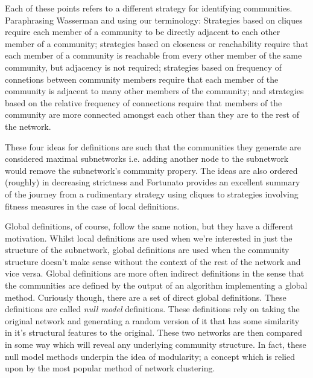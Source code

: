 Each of these points refers to a different strategy for identifying communities. Paraphrasing Wasserman and using our terminology: Strategies based on cliques require each member of a community to be directly adjacent to each other member of a community; strategies based on closeness or reachability require that each member of a community is reachable from every other member of the same community, but adjacency is not required; strategies based on frequency of connetions between community members require that each member of the community is adjacent to many other members of the community; and strategies based on the relative frequency of connections require that members of the community are more connected amongst each other than they are to the rest of the network.

These four ideas for definitions are such that the communities they generate are considered maximal subnetworks i.e. adding another node to the subnetwork would remove the subnetwork's community propery. The ideas are also ordered (roughly) in decreasing strictness and Fortunato provides an excellent summary of the journey from a rudimentary strategy using cliques to strategies involving fitness measures in the case of local definitions.\cite[88-90]{fortunato}

Global definitions, of course, follow the same notion, but they have a different motivation. Whilst local definitions are used when we're interested in just the structure of the subnetwork, global definitions are used when the community structure doesn't make sense without the context of the rest of the network and vice versa. Global definitions are more often indirect definitions in the sense that the communities are defined by the output of an algorithm implementing a global method. Curiously though, there are a set of direct global definitions. These definitions are called \emph{null model} definitions. These definitions rely on taking the original network and generating a random version of it that has some similarity in it's structural features to the original. These two networks are then compared in some way which will reveal any underlying community structure. In fact, these null model methods underpin the idea of modularity; a concept which is relied upon by the most popular method of network clustering.

